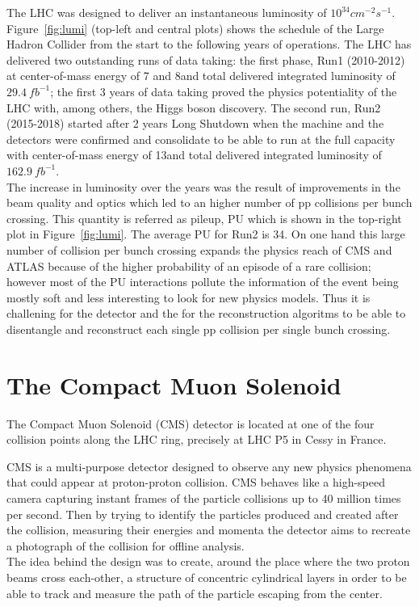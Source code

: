 The LHC was designed to deliver an instantaneous luminosity
of $10^{34}cm^{-2}s^{-1}$. Figure~\ref{fig:lumi} (top-left and central
plots) shows the schedule of the Large Hadron Collider from the start
to the following years of operations. The LHC has delivered two
outstanding runs of data taking: the first phase, Run1 (2010-2012) at
center-of-mass energy of 7 and 8\TeV and total delivered integrated
luminosity of $29.4\ fb^{-1}$; the first 3 years of data taking proved
the physics potentiality of the LHC with, among others, the Higgs boson
discovery. The second run, Run2 (2015-2018) started after 2 years Long
Shutdown when the machine and the detectors were confirmed and
consolidate to be able to run at the full capacity with 
center-of-mass energy of 13\TeV and total delivered integrated
luminosity of $162.9\ fb^{-1}$.\\
The increase in luminosity over the
years was the result of improvements in the beam quality and optics which
led to an higher number of pp collisions per bunch crossing. This
quantity is referred as pileup, PU which is shown in the top-right plot
in Figure~\ref{fig:lumi}. The average \textlangle{}PU\textrangle{} for
Run2 is 34. On one hand this large
number of collision per bunch crossing 
expands the physics reach of CMS and ATLAS because of
the higher probability of an episode of a rare collision; however
most of the PU interactions pollute the information of the
event being mostly soft and less interesting to look for
new physics models. Thus it is challening for the detector and the for
the reconstruction algoritms to be able 
to disentangle and reconstruct each single pp collision per single
bunch crossing.

\section{The Compact Muon Solenoid}

The Compact Muon Solenoid (CMS) detector is located at one of the four
collision points along the LHC ring, precisely at LHC P5 in Cessy in
France.  

CMS is a multi-purpose detector designed to observe any new physics
phenomena that could appear at proton-proton collision. CMS behaves
like a high-speed camera capturing instant frames of the particle
collisions up to 40 million times per second. Then by trying to
identify the particles produced and created after the collision,
measuring their energies and momenta the detector aims to recreate a
photograph of the collision for offline analysis. \\
The idea behind the design was to create, around the place where the
two proton beams cross each-other, a structure of concentric cylindrical layers
in order to be able to track and measure the path of the particle
escaping from the center.   

